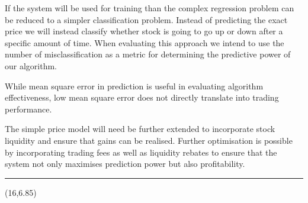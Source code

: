 \documentclass[a0]{a0poster}
\def\Subhead#1{\noindent{\large\color{DarkBlue}\sf #1}\bigskip}
\begin{document}
\begin{textblock}{7}
If the system will be used for training than the complex regression problem can be reduced to a simpler classification problem. Instead of predicting the exact price we will instead classify whether stock is going to go up or down after a specific amount of time. When evaluating this approach we intend to use the number of misclassification as a metric for determining the predictive power of our algorithm.


\bigskip

\Subhead{Back-testing}

While mean square error in prediction is useful in evaluating algorithm effectiveness, low mean square error does not directly translate into trading performance.  

The simple price model will need be further extended to incorporate stock liquidity and ensure that gains can be realised. Further optimisation is possible by incorporating trading fees as well as liquidity rebates to ensure that the system not only maximises prediction power but also profitability.


\bigskip
\hrule
\end{textblock}


\begin{textblock}{7}(16,6.85)
\bigskip
\bigskip
\bigskip
\bigskip


\sf



\vspace*{4mm} %
\bigskip

\end{textblock}




\end{document}
